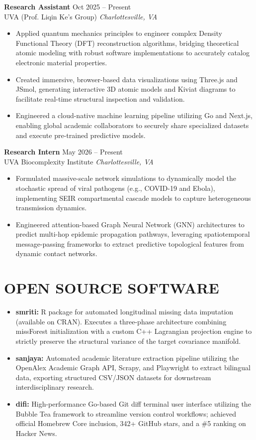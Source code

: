 \documentclass[11pt, letterpaper]{article}
\newenvironment{cvitemize}{
    \begin{itemize}[leftmargin=0.2in, label={\textbullet}, itemsep=4pt, parsep=0pt, topsep=4pt]
}{
    \end{itemize}
}
\newcommand{\cvheading}[4]{
    \vspace{4pt}
    \noindent\textbf{#1} \hfill #2 \\
    #3 \hfill \textit{#4} \vspace{2pt}
}
\begin{document}
\cvheading{Research Assistant}{Oct 2025 -- Present}{UVA (Prof. Liqin Ke's Group)}{Charlottesville, VA}
\begin{cvitemize}
    \item Applied quantum mechanics principles to engineer complex Density Functional Theory (DFT) reconstruction algorithms, bridging theoretical atomic modeling with robust software implementations to accurately catalog electronic material properties.
    \item Created immersive, browser-based data visualizations using Three.js and JSmol, generating interactive 3D atomic models and Kiviat diagrams to facilitate real-time structural inspection and validation.
    \item Engineered a cloud-native machine learning pipeline utilizing Go and Next.js, enabling global academic collaborators to securely share specialized datasets and execute pre-trained predictive models.
\end{cvitemize}

\cvheading{Research Intern}{May 2026 -- Present}{UVA Biocomplexity Institute}{Charlottesville, VA}
\begin{cvitemize}
    \item Formulated massive-scale network simulations to dynamically model the stochastic spread of viral pathogens (e.g., COVID-19 and Ebola), implementing SEIR compartmental cascade models to capture heterogeneous transmission dynamics.
    \item Engineered attention-based Graph Neural Network (GNN) architectures to predict multi-hop epidemic propagation pathways, leveraging spatiotemporal message-passing frameworks to extract predictive topological features from dynamic contact networks.
\end{cvitemize}

\section{OPEN SOURCE SOFTWARE}
\begin{cvitemize}
    \item \textbf{smriti:} R package for automated longitudinal missing data imputation (available on CRAN). Executes a three-phase architecture combining missForest initialization with a custom C++ Lagrangian projection engine to strictly preserve the structural variance of the target covariance manifold.
    \item \textbf{sanjaya:} Automated academic literature extraction pipeline utilizing the OpenAlex Academic Graph API, Scrapy, and Playwright to extract bilingual data, exporting structured CSV/JSON datasets for downstream interdisciplinary research.
    \item \textbf{difi:} High-performance Go-based Git diff terminal user interface utilizing the Bubble Tea framework to streamline version control workflows; achieved official Homebrew Core inclusion, 342+ GitHub stars, and a \#5 ranking on Hacker News.
\end{cvitemize}
\end{document}
